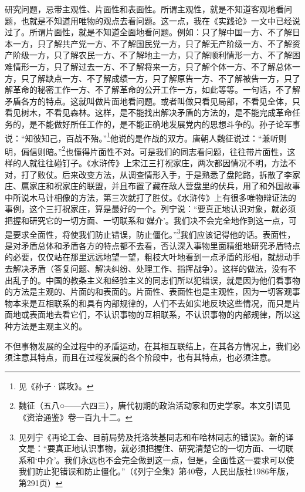 \documentclass[UTF8, 12pt, a4paper]{ctexrep}
\begin{document}
研究问题，忌带主观性、片面性和表面性。所谓主观性，就是不知道客观地看问题，也就是不知道用唯物的观点去看问题。这一点，我在《实践论》一文中已经说过了。所谓片面性，就是不知道全面地看问题。例如：只了解中国一方、不了解日本一方，只了解共产党一方、不了解国民党一方，只了解无产阶级一方、不了解资产阶级一方，只了解农民一方、不了解地主一方，只了解顺利情形一方、不了解困难情形一方，只了解过去一方、不了解将来一方，只了解个体一方、不了解总体一方，只了解缺点一方、不了解成绩一方，只了解原告一方、不了解被告一方，只了解革命的秘密工作一方、不了解革命的公开工作一方，如此等等。一句话，不了解矛盾各方的特点。这就叫做片面地看问题。或者叫做只看见局部，不看见全体，只看见树木，不看见森林。这样，是不能找出解决矛盾的方法的，是不能完成革命任务的，是不能做好所任工作的，是不能正确地发展党内的思想斗争的。孙子论军事说：“知彼知己，百战不殆。”\footnote{见《孙子·谋攻》。}他说的是作战的双方。唐朝人魏征说过：“兼听则明，偏信则暗。”\footnote{魏征（五八○——六四三），唐代初期的政治活动家和历史学家。本文引语见《资治通鉴》卷一百九十二。}也懂得片面性不对。可是我们的同志看问题，往往带片面性，这样的人就往往碰钉子。《水浒传》上宋江三打祝家庄，两次都因情况不明，方法不对，打了败仗。后来改变方法，从调查情形入手，于是熟悉了盘陀路，拆散了李家庄、扈家庄和祝家庄的联盟，并且布置了藏在敌人营盘里的伏兵，用了和外国故事中所说木马计相像的方法，第三次就打了胜仗。《水浒传》上有很多唯物辩证法的事例，这个三打祝家庄，算是最好的一个。列宁说：“要真正地认识对象，就必须把握和研究它的一切方面、一切联系和‘媒介’。我们决不会完全地作到这一点，可是要求全面性，将使我们防止错误，防止僵化。”\footnote{见列宁《再论工会、目前局势及托洛茨基同志和布哈林同志的错误》。新的译文是：“要真正地认识事物，就必须把握住、研究清楚它的一切方面、一切联系和‘中介’。我们永远也不会完全做到这一点，但是，全面性这一要求可以使我们防止犯错误和防止僵化。”（《列宁全集》第40卷，人民出版社1986年版，第291页）}我们应该记得他的话。表面性，是对矛盾总体和矛盾各方的特点都不去看，否认深入事物里面精细地研究矛盾特点的必要，仅仅站在那里远远地望一望，粗枝大叶地看到一点矛盾的形相，就想动手去解决矛盾（答复问题、解决纠纷、处理工作、指挥战争）。这样的做法，没有不出乱子的。中国的教条主义和经验主义的同志们所以犯错误，就是因为他们看事物的方法是主观的、片面的和表面的。片面性、表面性也是主观性，因为一切客观事物本来是互相联系的和具有内部规律的，人们不去如实地反映这些情况，而只是片面地或表面地去看它们，不认识事物的互相联系，不认识事物的内部规律，所以这种方法是主观主义的。

不但事物发展的全过程中的矛盾运动，在其相互联结上，在其各方情况上，我们必须注意其特点，而且在过程发展的各个阶段中，也有其特点，也必须注意。
\end{document}
